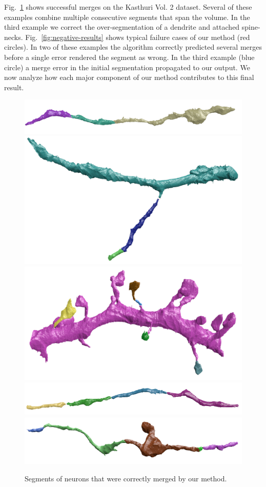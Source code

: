 Fig.~\ref{fig:positive-results} shows successful merges on the Kasthuri Vol. 2 dataset. Several of these examples combine multiple consecutive segments that span the volume.
In the third example we correct the over-segmentation of a dendrite and attached spine-necks.
Fig.~\ref{fig:negative-results} shows typical failure cases of our method (red circles).
In two of these examples the algorithm correctly predicted several merges before a single error rendered the segment as wrong.
In the third example (blue circle) a merge error in the initial segmentation propagated to our output.
We now analyze how each major component of our method contributes to this final result.

\begin{figure}[t]
	\centering
	\includegraphics[width=0.85\linewidth]{./figures/VI-results/multicut-correct1.png}
	\includegraphics[width=0.85\linewidth]{./figures/VI-results/multicut-correct2.png}
	\includegraphics[width=0.85\linewidth]{./figures/VI-results/multicut-correct3.png}
	\includegraphics[width=0.85\linewidth]{./figures/VI-results/multicut-correct4.png}
	\includegraphics[width=0.85\linewidth]{./figures/VI-results/multicut-correct5.png}
	\caption{Segments of neurons that were correctly merged by our method.}
	\label{fig:positive-results}
\end{figure}

